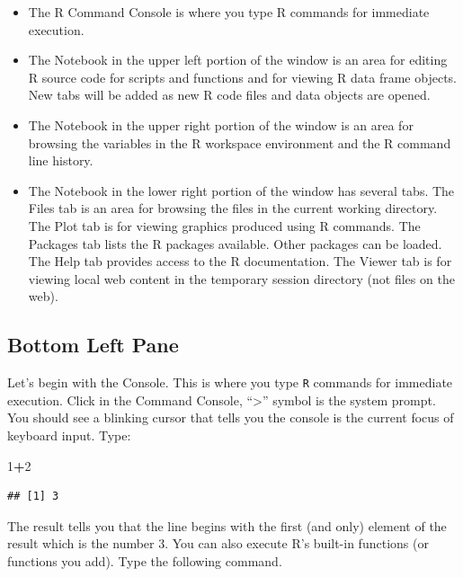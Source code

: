 \documentclass[
]{book}
\newenvironment{Shaded}{\begin{snugshade}}{\end{snugshade}}
\newcommand{\DecValTok}[1]{\textcolor[rgb]{0.00,0.00,0.81}{#1}}
\newcommand{\OperatorTok}[1]{\textcolor[rgb]{0.81,0.36,0.00}{\textbf{#1}}}
\begin{document}
\begin{itemize}
\item
  The R Command Console is where you type R commands for immediate execution.
\item
  The Notebook in the upper left portion of the window is an area for editing R source code for scripts and functions and for viewing R data frame objects. New tabs will be added as new R code files and data objects are opened.
\item
  The Notebook in the upper right portion of the window is an area for browsing the variables in the R workspace environment and the R command line history.
\item
  The Notebook in the lower right portion of the window has several tabs. The Files tab is an area for browsing the files in the current working directory. The Plot tab is for viewing graphics produced using R commands. The Packages tab lists the R packages available. Other packages can be loaded. The Help tab provides access to the R documentation. The Viewer tab is for viewing local web content in the temporary session directory (not files on the web).
\end{itemize}

\hypertarget{bottom-left-pane}{%
\subsection*{Bottom Left Pane}\label{bottom-left-pane}}

Let's begin with the Console. This is where you type \texttt{R} commands for immediate execution. Click in the Command Console, ``\textgreater{}'' symbol is the system prompt. You should see a blinking cursor that tells you the console is the current focus of keyboard input. Type:

\begin{Shaded}
\begin{Highlighting}[]
\DecValTok{1}\OperatorTok{+}\DecValTok{2}
\end{Highlighting}
\end{Shaded}

\begin{verbatim}
## [1] 3
\end{verbatim}

The result tells you that the line begins with the first (and only) element of the result which is the number 3. You can also execute R's built-in functions (or functions you add). Type the following command.
\end{document}
